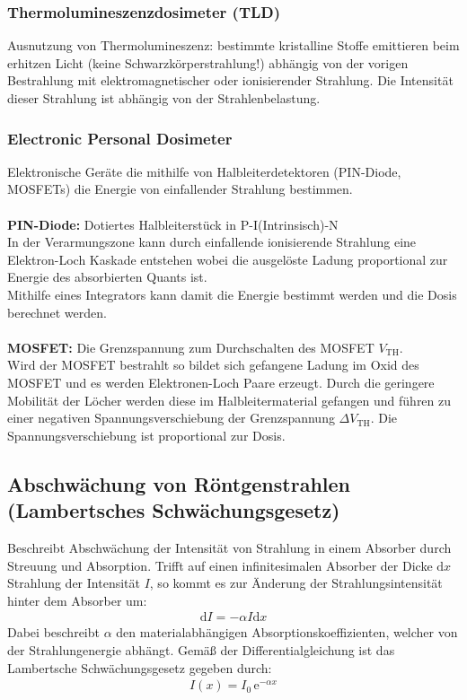 \documentclass[11pt, a4paper]{article}
\numberwithin{equation}{section}
\begin{document}
\subsubsection{Thermolumineszenzdosimeter (TLD)}
Ausnutzung von Thermolumineszenz: bestimmte kristalline Stoffe emittieren beim erhitzen Licht (keine Schwarzkörperstrahlung!) abhängig von der vorigen Bestrahlung mit elektromagnetischer oder ionisierender Strahlung.
Die Intensität dieser Strahlung ist abhängig von der Strahlenbelastung.

\subsubsection{Electronic Personal Dosimeter}
Elektronische Geräte die mithilfe von Halbleiterdetektoren (PIN-Diode, MOSFETs) die Energie von einfallender Strahlung bestimmen.\\
\\
\textbf{PIN-Diode:} Dotiertes Halbleiterstück in P-I(Intrinsisch)-N\\
In der Verarmungszone kann durch einfallende ionisierende Strahlung eine Elektron-Loch Kaskade entstehen wobei die ausgelöste Ladung proportional zur Energie des absorbierten Quants ist.\\
Mithilfe eines Integrators kann damit die Energie bestimmt werden und die Dosis berechnet werden.\\
\\
\textbf{MOSFET:} Die Grenzspannung zum Durchschalten des MOSFET $V_\mathrm{TH}$.\\
Wird der MOSFET bestrahlt so bildet sich gefangene Ladung im Oxid des MOSFET und es werden Elektronen-Loch Paare erzeugt.
Durch die geringere Mobilität der Löcher werden diese im Halbleitermaterial gefangen und führen zu einer negativen Spannungsverschiebung der Grenzspannung $\Delta V_\mathrm{TH}$.
Die Spannungsverschiebung ist proportional zur Dosis.


\subsection{Abschwächung von Röntgenstrahlen (Lambertsches Schwächungsgesetz)}
Beschreibt Abschwächung der Intensität von Strahlung in einem Absorber durch Streuung und Absorption.
Trifft auf einen infinitesimalen Absorber der Dicke $\mathrm{d} x$ Strahlung der Intensität $I$, so kommt es zur Änderung der Strahlungsintensität hinter dem Absorber um:
\begin{align}
	\mathrm{d} I = - \alpha I \mathrm{d} x
\end{align}
Dabei beschreibt $\alpha$ den materialabhängigen Absorptionskoeffizienten, welcher von der Strahlungenergie abhängt.
Gemäß der Differentialgleichung ist das Lambertsche Schwächungsgesetz gegeben durch:
\begin{align}
	I(x) = I_0 \, \mathrm{e}^{-\alpha x}
\end{align}
\end{document}
